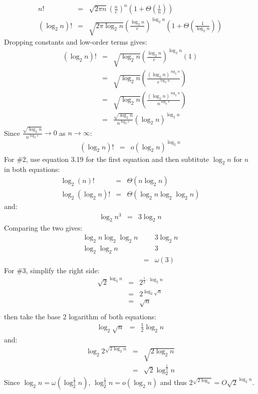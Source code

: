 \documentclass{article}
\begin{document}
\begin{eqnarray*}
	n! &=& \sqrt{2 \pi n} \left ( \frac{n}{e} \right )^n \left ( 1 + \Theta \left ( \frac{1}{n} \right ) \right ) \\
	(\log_2 n)! &=& \sqrt{2 \pi \log_2 n} \left ( \frac{\log_2 n}{e} \right )^{\log_2 n} \left ( 1 + \Theta \left ( \frac{1}{\log_2 n} \right ) \right )
\end{eqnarray*}
Dropping constants and low-order terms gives:
\begin{eqnarray*}
	(\log_2 n)! &=& \sqrt{\log_2 n} \left ( \frac{\log_2 n}{e} \right )^{\log_2 n} (1) \\
	&=& \sqrt{\log_2 n} \left ( \frac{(\log_2 n)^{\log_2 n}}{e^{\log_2 n}} \right ) \\
	&=& \sqrt{\log_2 n} \left ( \frac{(\log_2 n)^{\log_2 n}}{n^{\log_2 e}} \right ) \\
	&=& \frac{\sqrt{\log_2 n}}{n^{\log_2 e}} ( \log_2 n )^{\log_2 n}
\end{eqnarray*}
Since $\frac{\sqrt{\log_2 n}}{n^{\log_2 e}} \rightarrow 0$ as $n \rightarrow \infty$:
\begin{eqnarray*}
	(\log_2 n)! &=& o(\log_2 n)^{\log_2 n}
\end{eqnarray*}
For \#2, use equation 3.19 for the first equation and then subtitute $\log_2 n$ for $n$ in both equations:
\begin{eqnarray*}
	\log_2 (n)! & = & \Theta (n \log_2 n) \\
	\log_2 (\log_2 n)! & = & \Theta (\log_2 n \log_2 \log_2 n)
\end{eqnarray*}
and:
\begin{eqnarray*}
	\log_2 n^3 & = & 3 \log_2 n
\end{eqnarray*}
Comparing the two gives:
\begin{eqnarray*}
	\log_2 n \log_2 \log_2 n &   & 3 \log_2 n \\
	\log_2 \log_2 n &   & 3 \\
	& = & \omega(3)
\end{eqnarray*}
For \#3, simplify the right side:
\begin{eqnarray*}
	\sqrt{2}^{\log_2 n} & = & 2^{\frac{1}{2} \cdot \log_2 n} \\
	& = & 2^{\log_2 \sqrt{n}} \\
	& = & \sqrt{n} \\
\end{eqnarray*}
then take the base 2 logarithm of both equations:
\begin{eqnarray*}
	\log_2 \sqrt{n} & = & \frac{1}{2} \log_2 n
\end{eqnarray*}
and:
\begin{eqnarray*}
	\log_2 2^{\sqrt{2 \log_2 n}} & = & \sqrt{2 \log_2 n} \\
	& = & \sqrt{2} \log_2^{\frac{1}{2}} n
\end{eqnarray*}
Since $\log_2 n = \omega (\log_2^{\frac{1}{2}} n)$, $\log_2^{\frac{1}{2}} n = o(\log_2n)$ and thus $2^{\sqrt{2 \log_n}} = O \sqrt{2}^{\log_2 n}$.
\end{document}
